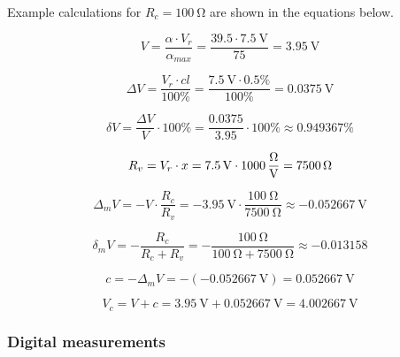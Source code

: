 Example calculations for $R_c = \SI{100}{\ohm} $ are shown in the equations below. %

\begin{equation}
	 V = \frac{\alpha\cdot V_{r}}{\alpha_{max}} = \frac{39.5\cdot \SI{7.5}{\volt}}{75} = \SI{3.95}{\volt}
	 \label{eq:analog_V}
\end{equation}

\begin{equation}
	\Delta V = \frac{V_{r}\cdot cl}{100\unit{\percent}} = \frac{\SI{7.5}{\volt}\cdot 0.5\unit{\percent}}{100 \unit{\percent}} = \SI{0.0375}{\volt}
	\label{eq:analog_Delta_V}
\end{equation}

\begin{equation}
	  \delta V = \frac{\Delta V}{V}\cdot 100\unit{\percent} = \frac{0.0375}{3.95}\cdot 100\unit{\percent} \approx 0.949367\unit{\percent}
	  \label{eq:analog_delta_V}
\end{equation}

\begin{equation}
	R_v = V_r\cdot x = \SI{7.5}{\volt}\cdot \SI{1000}{\frac{\ohm}{\volt}} = \SI{7500}{\ohm}
	\label{eq:analog_R_v}
\end{equation}

\begin{equation}
	\Delta_m V = -V\cdot\frac{R_c}{R_v} = -\SI{3.95}{\volt}\cdot\frac{\SI{100}{\ohm}}{\SI{7500}{\ohm}} \approx -\SI{0.052667}{\volt}
	\label{eq:analog_Delta_m}
\end{equation}

\begin{equation}
	\delta_m V = -\frac{R_c}{R_c + R_v} = -\frac{\SI{100}{\ohm}}{\SI{100}{\ohm} + \SI{7500}{\ohm}} \approx -0.013158
	\label{eq:analog_delta_m}
\end{equation}

\begin{equation}
	c = -\Delta_m V = -(-\SI{0.052667}{\volt}) = \SI{0.052667}{\volt}
	\label{eq:analog_c}
\end{equation}

\begin{equation}
	V_c = V + c = \SI{3.95}{\volt} + \SI{0.052667}{\volt} = \SI{4.002667}{\volt}
	\label{eq:analog_V_c}
\end{equation}


\subsubsection*{Digital measurements}

